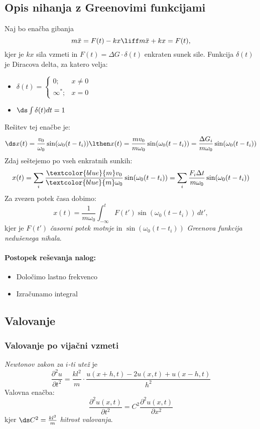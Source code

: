 \subsection{Opis nihanja z Greenovimi funkcijami}
Naj bo enačba gibanja \[m\ddot{x} = F(t) - kx \liff m \ddot{x} + kx = F(t),\] kjer je \(kx\) sila vzmeti in \(F(t) = \Delta G \cdot \delta(t)\) enkraten sunek sile. Funkcija \(\delta(t)\) je Diracova delta, za katero velja:
\begin{itemize}
    \item \(\delta(t) = \begin{cases}
        0; &x \neq 0 \\ \infty^*; &x=0
    \end{cases}\)
    \item \(\ds \int \delta(t) dt = 1\)
\end{itemize}
%
Rešitev tej enačbe je:
\[\ds x(t) = \frac{v_0}{\omega_0} \sin(\omega_0 (t - t_i)) \lthen x(t) = \frac{mv_0}{m\omega_0} \sin(\omega_0 (t - t_i)) = \frac{\Delta G_i}{m\omega_0} \sin(\omega_0 (t - t_i))\]
%
Zdaj seštejemo po vseh enkratnih sunkih:
\[
x(t) = \sum_i \frac{\textcolor{blue}{m}v_0}{\textcolor{blue}{m}\omega_0} \sin(\omega_0 (t - t_i)) = \sum_i \frac{F_i \Delta t}{m\omega_0}\sin(\omega_0 (t - t_i))
\]
%
Za zvezen potek časa dobimo:
\[
x(t) = \frac{1}{m\omega_0} \int_{-\infty}^{t} F(t') \sin(\omega_0 (t - t_i)) \, dt',
\]
%
kjer je \(F(t')\) \emph{časovni potek motnje} in \(\sin(\omega_0 (t - t_i))\) \emph{Greenova funkcija nedušenega nihala}.
%
\paragraph{Postopek reševanja nalog:}
\begin{itemize}
    \item Določimo lastno frekvenco
    \item Izračunamo integral
\end{itemize}

\subsection{Valovanje}
\subsubsection*{Valovanje po vijačni vzmeti}
\emph{Newtonov zakon za \(i\)-ti utež} je
%
\[
    \frac{\partial^2 u}{\partial t^2} = \frac{kl^2}{m} \cdot \frac{u(x+h, t) - 2u(x, t) + u(x -h, t)}{h^2}
\]
%
Valovna enačba:
%
\[
    \boxed{\frac{\partial^2 u(x, t)}{\partial t^2} = C^2 \frac{\partial^2u(x,t)}{\partial x^2}}
\]
%
kjer \(\ds C^2 = \frac{kl^2}{m}\) \emph{hitrost valovanja}.

